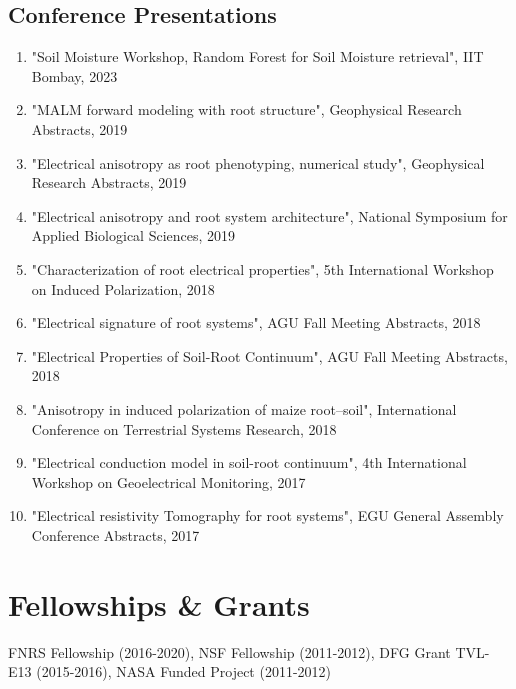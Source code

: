 \documentclass[11pt,a4paper]{article}
\begin{document}
\subsection*{Conference Presentations}
\begin{enumerate}[leftmargin=*]
    \item "Soil Moisture Workshop, Random Forest for Soil Moisture retrieval", IIT Bombay, 2023
    \item "MALM forward modeling with root structure", Geophysical Research Abstracts, 2019
    \item "Electrical anisotropy as root phenotyping, numerical study", Geophysical Research Abstracts, 2019
    \item "Electrical anisotropy and root system architecture", National Symposium for Applied Biological Sciences, 2019
    \item "Characterization of root electrical properties", 5th International Workshop on Induced Polarization, 2018
    \item "Electrical signature of root systems", AGU Fall Meeting Abstracts, 2018
    \item "Electrical Properties of Soil-Root Continuum", AGU Fall Meeting Abstracts, 2018
    \item "Anisotropy in induced polarization of maize root--soil", International Conference on Terrestrial Systems Research, 2018
    \item "Electrical conduction model in soil-root continuum", 4th International Workshop on Geoelectrical Monitoring, 2017
    \item "Electrical resistivity Tomography for root systems", EGU General Assembly Conference Abstracts, 2017
\end{enumerate}

\section*{Fellowships \& Grants}
FNRS Fellowship (2016-2020), NSF Fellowship (2011-2012), DFG Grant TVL-E13 (2015-2016), NASA Funded Project (2011-2012)
\end{document}
